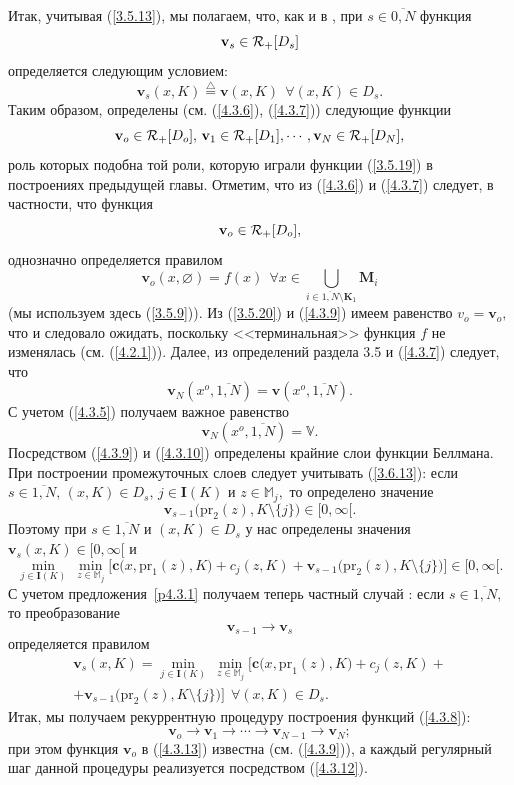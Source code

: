 \documentclass[11pt,twoside,openany]{report}
\newcommand{\bfn}{\begin{equation}}
\newcommand{\efn}{\end{equation}}
\newcommand{\df}{\stackrel{\triangle}{=}}
\newcommand{\ov}{\overline}
\newcommand{\sm}{\setminus}
\newcommand{\fa}{\forall}
\newcommand{\car}{{\cal R}}
\newcommand{\bbm}{{\mathbb M}}
\newcommand{\emp}{\varnothing}
\begin{document}
{Итак, учитывая (\ref{3.5.13}), мы полагаем, что, как и в \cite[(6.12)]{Cha3`}, при
$s\in \ov{0,N}$ функция
\bfn\label{4.3.6`}\mathbf{v}_s\in \car_+ [D_s]
\efn
определяется следующим условием:
\bfn\label{4.3.7}\mathbf{v}_s(x,K) \df \mathbf{v}(x,K)\ \ \fa (x,K)\in D_s.
\efn
Таким образом, определены (см. (\ref{4.3.6}), (\ref{4.3.7})) следующие функции
$$
\mathbf{v}_o\in \car_+[D_o],\,\mathbf{v}_1\in \car_+[D_1],\cdots,
\mathbf{v}_N\in \car_+[D_N],
$$
роль которых подобна той роли, которую играли функции (\ref{3.5.19}) в
построениях предыдущей главы. Отметим, что из (\ref{4.3.6}) и (\ref{4.3.7})
следует, в частности, что функция
\bfn\label{4.3.8}
\mathbf{v}_o\in \car_+[D_o],
\efn
однозначно определяется правилом
\bfn\label{4.3.9}\mathbf{v}_o(x,\emp) = f(x)\ \ \fa x\in
\bigcup\limits_{i\in\ov{1,N}\sm \mathbf{K}_1}\mathbf{M}_i
\efn
(мы используем здесь (\ref{3.5.9})). Из (\ref{3.5.20}) и (\ref{4.3.9})
имеем равенство $v_o = \mathbf{v}_o,$ что и следовало ожидать, поскольку
<<терминальная>> функция $f$ не изменялась
(см. (\ref{4.2.1})). Далее, из определений раздела 3.5 и (\ref{4.3.7})
следует, что
$$
\mathbf{v}_N(x^o,\ov{1,N}) = \mathbf{v}(x^o,\ov{1,N}).
$$
С учетом (\ref{4.3.5}) получаем важное равенство
\bfn\label{4.3.10}\mathbf{v}_N(x^o,\ov{1,N})= \mathbb{V}.
\efn
Посредством (\ref{4.3.9}) и (\ref{4.3.10}) определены крайние слои
функции Беллмана. При построении
промежуточных слоев следует учитывать (\ref{3.6.13}):  если $s\in\ov{1,N},\,
(x,K)\in D_s,\,j\in \mathbf{I}(K)$ и $z\in \bbm_j,$ то определено значение
$$
\mathbf{v}_{s-1}\bigl(\mathrm{pr}_2(z),K\sm\{j\}\bigl)\in [0,\infty[.
$$
Поэтому при $s\in\ov{1,N}$ и $(x,K)\in D_s$ у нас определены значения
$\mathbf{v}_s(x,K)\in [0,\infty[$ и
$$
\min\limits_{j\in \mathbf{I}(K)}\ \min\limits_{z\in\bbm_j}
\bigl[\mathbf{c}\bigl(x,\mathrm{pr}_1(z),K\bigl) +
c_j(z,K) + \mathbf{v}_{s-1}\bigl(\mathrm{pr}_2(z),K\sm\{j\}\bigl)
\bigl]\in [0,\infty[.
$$
С учетом предложения~\ref{p4.3.1}  получаем теперь частный
случай \cite[предложение~6.1]{Cha3`}:
если $s\in\ov{1,N},$ то преобразование
\bfn\label{4.3.11}
\mathbf{v}_{s-1}\longrightarrow \mathbf{v}_s
\efn
определяется правилом
\begin{eqnarray}
&\mathbf{v}_s(x,K) =  \min\limits_{j\in \mathbf{I}(K)}\
\min\limits_{z\in\bbm_j}\bigl[\mathbf{c}\bigl(x,\mathrm{pr}_1(z),K\bigl) +
 c_j(z,K) +
&\nonumber\\
&+\mathbf{v}_{s-1}\bigl(\mathrm{pr}_2(z),K\sm\{j\}\bigl)\bigl]\ \
\fa (x,K)\in  D_s.
\label{4.3.12}
\end{eqnarray}
Итак, мы получаем рекуррентную процедуру построения функций (\ref{4.3.8}):
\bfn\label{4.3.13}
\mathbf{v}_o\longrightarrow  \mathbf{v}_1\longrightarrow\cdots
\longrightarrow \mathbf{v}_{N-1}\longrightarrow \mathbf{v}_N;
\efn
при этом функция $\mathbf{v}_o$ в (\ref{4.3.13}) известна
(см. (\ref{4.3.9})), а каждый регулярный
шаг данной процедуры реализуется посредством  (\ref{4.3.12}).

}
\end{document}
